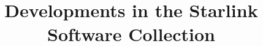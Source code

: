 \documentclass[11pt,twoside]{article}  %
\begin{document}

%


%

\title{Developments in the Starlink Software Collection}
       
%
%
%
%
%


%
\end{document}
